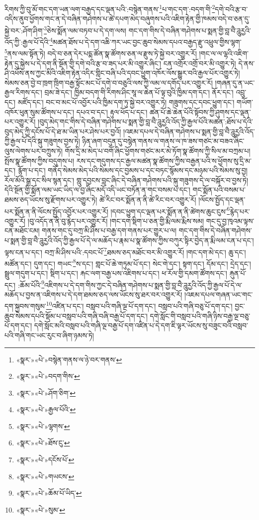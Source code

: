 རིགས་ཀྱི་བུ་མོ་གང་དག་ཡན་ལག་བརྒྱད་དང་ལྡན་པའི་:བསྙེན་གནས་\footnote{«སྣར་»«པེ་»བསྙེན་གནས་ལ་ཉེ་བར་གནས་}པ་གང་དག་:བདག་གི་\footnote{«སྣར་»«པེ་»བདག་གིས་}དགེ་བའི་རྩ་བ་འདིས་ནུབ་ཕྱོགས་གང་ན་དེ་བཞིན་གཤེགས་པ་ཚེ་དཔག་མེད་བཞུགས་པའི་འཇིག་རྟེན་གྱི་ཁམས་བདེ་བ་ཅན་དུ་སྐྱེ་བར་:ཤོག་ཤིག་\footnote{«སྣར་»«པེ་»ཤོག་ཅིག་}ཅེས་སྨོན་ལམ་བཏབ་པ་དེ་དག་ལས། གང་དག་གིས་དེ་བཞིན་གཤེགས་པ་སྨན་གྱི་བླ་བཻ་ཌཱུརྱའི་འོད་ཀྱི་:རྒྱལ་པོ་དེའི་\footnote{«སྣར་»«པེ་»རྒྱལ་པོའི་}མཚན་ཐོས་པ་དེ་དག་འཆི་ཀར་ཡང་བྱང་ཆུབ་སེམས་དཔའ་བརྒྱད་རྫུ་འཕྲུལ་གྱིས་ལྷག་\footnote{«སྣར་»«པེ་»ལྷགས་}ནས་ལམ་སྟོན་ཏེ། བདེ་བ་ཅན་དེར་པདྨ་ཚོན་སྣ་ཚོགས་ཅན་ལ་རྫུས་ཏེ་སྐྱེ་བར་འགྱུར་རོ། །གང་ལ་ལ་ལྷའི་འཇིག་རྟེན་དུ་སྐྱེས་པ་དེ་དག་ནི་སྔོན་གྱི་དགེ་བའི་རྩ་བ་ཟད་པར་མི་འགྱུར་ཞིང་། ངན་འགྲོར་འགྲོ་བར་མི་འགྱུར་ཏེ། དེ་ནས་ཤི་འཕོས་ནས་ཀྱང་མིའི་འཇིག་རྟེན་འདིར་གླིང་བཞི་པའི་དབང་ཕྱུག་འཁོར་ལོས་སྒྱུར་བའི་རྒྱལ་པོར་འགྱུར་ཏེ། སེམས་ཅན་བྱེ་བ་ཁྲག་ཁྲིག་བརྒྱ་སྟོང་མང་པོ་དགེ་བ་བཅུའི་ལས་ཀྱི་ལམ་ལ་དགོད་པར་འགྱུར་རོ། །གཞན་དུ་ན་ཡང་རྒྱལ་རིགས་དང་། བྲམ་ཟེ་དང་། ཁྱིམ་བདག་གི་རིགས་ཤིང་སཱ་ལ་ཆེན་པོ་ལྟ་བུའི་ཁྱིམ་དག་དང་། ནོར་དང་། འབྲུ་དང་། མཛོད་དང་། བང་བ་མང་པོ་འབྱོར་པའི་ཁྱིམ་དག་ཏུ་སྐྱེ་བར་འགྱུར་ཏེ། གཟུགས་དང་དབང་ཕྱུག་དང་། གཡོག་འཁོར་ཕུན་སུམ་ཚོགས་པ་དང་། དཔའ་བ་དང་། རྟུལ་ཕོད་པ་དང་། ཚན་པོ་ཆེ་ཆེན་པོའི་སྟོབས་ཀྱི་ཤུགས་དང་ལྡན་པར་འགྱུར་རོ། །བུད་མེད་གང་གིས་དེ་བཞིན་གཤེགས་པ་སྨན་གྱི་བླ་བཻ་ཌཱུརྱའི་འོད་ཀྱི་རྒྱལ་པོའི་མཚན་:ཐོས་པ་དེའི་བུད་མེད་ཀྱི་དངོས་པོ་དེ་ཐ་མ་ཡིན་པར་ཤེས་པར་བྱའོ། །འཇམ་དཔལ་དེ་བཞིན་གཤེགས་པ་སྨན་གྱི་བླ་བཻ་ཌཱུརྱའི་འོད་ཀྱི་རྒྱལ་པོ་དེའི་སྐུ་གཟུགས་བྱས་ཏེ། ཉིན་ཞག་བདུན་དུ་བསྙེན་གནས་ལ་གནས་ལ་ཁ་ཟས་གཙང་མ་བཟའ་ཞིང་ལུས་ལེགས་པར་བཀྲུས་ཏེ། གོས་དྲི་མ་མེད་པ་བགོ་ཞིང་ཕྱོགས་གཙང་མར་མེ་ཏོག་སྣ་ཚོགས་ཀྱི་སིལ་མ་བཀྲམ་པ། སྤོས་སྣ་ཚོགས་ཀྱིས་བདུགས་པ། རས་དང་གདུགས་དང་རྒྱལ་མཚན་སྣ་ཚོགས་ཀྱིས་བརྒྱན་པའི་ས་ཕྱོགས་སུ་དྲི་མ་དང་། རྙོག་པ་དང་། གནོད་སེམས་མེད་པའི་སེམས་དང་བྱམས་པ་དང་བཏང་སྙོམས་དང་མཉམ་པའི་སེམས་སུ་བྱ། རོལ་མོའི་སྒྲ་དང་སིལ་སྙན་དང་། གླུ་དབྱངས་བླང་ཞིང་དེ་བཞིན་གཤེགས་པའི་སྐུ་གཟུགས་དེ་ལ་བསྐོར་བ་བྱས་ཏེ། དེའི་སྔོན་གྱི་སྨོན་ལམ་ཡང་ཡིད་ལ་བྱ་ཞིང་མདོ་འདི་ཡང་བཏོན་ན་གང་བསམ་པ་དང་། གང་སྨོན་པའི་བསམ་པ་ཐམས་ཅད་ཡོངས་སུ་རྫོགས་པར་འགྱུར་ཏེ། ཚེ་རིང་བར་སྨོན་ན་ནི་ཚེ་རིང་བར་འགྱུར་རོ། །ལོངས་སྤྱོད་དང་ལྡན་པར་སྨོན་ན་ནི་ལོངས་སྤྱོད་འབྱོར་པར་འགྱུར་རོ། །དབང་ཕྱུག་དང་ལྡན་པར་སྨོན་ན་ནི་ཚེགས་ཆུང་ངུས་\footnote{«སྣར་»«པེ་»ཐོས་ངུ་}རྙེད་པར་འགྱུར་རོ། །བུ་འདོད་ན་ནི་བུ་རྙེད་པར་འགྱུར་རོ། །གང་དག་སྡིག་པ་ཅན་གྱི་རྨི་ལམ་རྨིས་སམ། གང་དུ་བྱ་ཁྭའམ་ལྟས་ངན་མཐོང་ངམ། གནས་གང་དུ་བཀྲ་མི་ཤིས་པ་བརྒྱ་དག་གནས་པར་གྱུར་པ་ལ། གང་དག་གིས་དེ་བཞིན་གཤེགས་པ་སྨན་གྱི་བླ་བཻ་ཌཱུརྱའི་འོད་ཀྱི་རྒྱལ་པོ་དེ་ལ་མཆོད་པ་རྣམ་པ་སྣ་ཚོགས་ཀྱིས་བཀུར་སྟིར་བྱེད་ན་རྨི་ལམ་ངན་པ་དང་། ལྟས་ངན་པ་དང་། བཀྲ་མི་ཤིས་པའི་:དབང་པོ་\footnote{«སྣར་»«པེ་»དངོས་པོ་}ཐམས་ཅད་མཐོང་བར་མི་འགྱུར་རོ། །གང་དག་མེ་དང་། ཆུ་དང་། མཚོན་དང་། དུག་དང་། གཡང་\footnote{«སྣར་»«པེ་»གཡངས་}ས་དང་། གླང་པོ་ཆེ་གཏུམ་པོ་དང་། སེང་གེ་དང་། སྟག་དང་། དོམ་དང་། དྲེད་དང་། སྦྲུལ་གདུག་པ་དང་། སྡིག་པ་དང་། རྐང་ལག་བརྒྱ་པས་འཇིགས་པ་དང་། ཕ་རོལ་གྱི་དམག་ཚོགས་དང་། རྐུན་པོ་དང་། :ཆོམ་པོའི་\footnote{«སྣར་»«པེ་»ཆོམ་པོ་ཡིད་}འཇིགས་པ་དེ་དག་གིས་ཀྱང་དེ་བཞིན་གཤེགས་པ་སྨན་གྱི་བླ་བཻ་ཌཱུརྱའི་འོད་ཀྱི་རྒྱལ་པོ་དེ་ལ་མཆོད་པ་བྱས་ན་འཇིགས་པ་དེ་དག་ཐམས་ཅད་ལས་ཡོངས་སུ་ཐར་བར་འགྱུར་རོ། །འཇམ་དཔལ་གཞན་ཡང་གང་དག་སྐྱབས་གསུམ་\footnote{«སྣར་»«པེ་»སུམ་}འཛིན་པ་དང་། བསླབ་པའི་གཞི་ལྔ་པོ་དག་དང་། བསླབ་པའི་གཞི་བཅུ་པོ་དག་དང་། བྱང་ཆུབ་སེམས་དཔའི་སྡོམ་པ་བསླབ་པའི་གཞི་བཞི་བརྒྱ་པོ་དག་དང་། དགེ་སློང་གི་བསླབ་པའི་གཞི་ཉིས་བརྒྱ་ལྔ་བཅུ་པོ་དག་དང་། དགེ་སློང་མའི་བསླབ་པའི་གཞི་ལྔ་བརྒྱ་པོ་དག་འཛིན་པ་དེ་དག་ཇི་ལྟར་ཡོངས་སུ་བཟུང་བའི་བསླབ་པའི་གཞི་གང་ཡང་རུང་བ་ཞིག་ཉམས་ཏེ། 